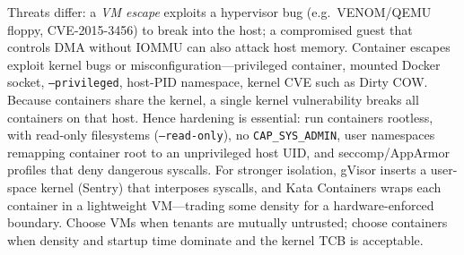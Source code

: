 Threats differ: a \emph{VM escape} exploits a hypervisor bug (e.g.\ VENOM/QEMU floppy, CVE-2015-3456) to break into the host; a compromised guest that controls DMA without IOMMU can also attack host memory. Container escapes exploit kernel bugs or misconfiguration---privileged container, mounted Docker socket, \texttt{--privileged}, host-PID namespace, kernel CVE such as Dirty COW. Because containers share the kernel, a single kernel vulnerability breaks all containers on that host.
Hence hardening is essential: run containers rootless, with read-only filesystems (\texttt{--read-only}), no \texttt{CAP\_SYS\_ADMIN}, user namespaces remapping container root to an unprivileged host UID, and seccomp/AppArmor profiles that deny dangerous syscalls. For stronger isolation, gVisor inserts a user-space kernel (Sentry) that interposes syscalls, and Kata Containers wraps each container in a lightweight VM---trading some density for a hardware-enforced boundary. Choose VMs when tenants are mutually untrusted; choose containers when density and startup time dominate and the kernel TCB is acceptable.
